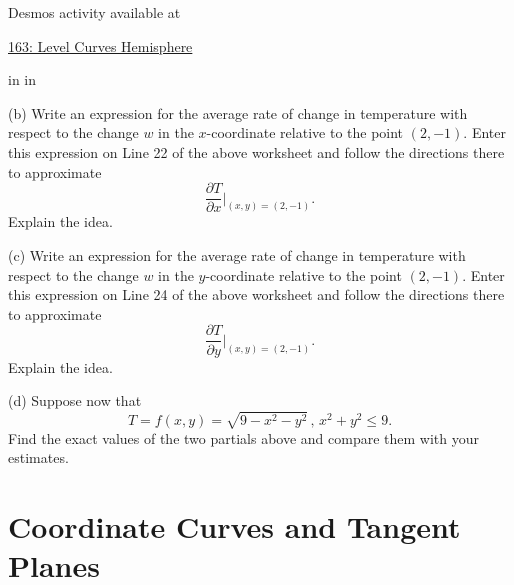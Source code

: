 \documentclass{ximera}
\newcommand{\pskip}{\vskip 0.1 in}
\begin{document}
\begin{example}
Desmos activity available at

\href{https://www.desmos.com/calculator/mrbwyydrcm}{163: Level Curves Hemisphere}

\pskip \pskip


(b) Write an expression for the average rate of change in temperature with respect to the change $w$ in the $x$-coordinate relative to the point $(2,-1)$. Enter this expression on Line 22 of the above worksheet and follow the directions there to approximate 
\[
   \frac{\partial T}{\partial x}\Big|_{(x,y)=(2,-1)} .
\]
Explain the idea.

(c) Write an expression for the average rate of change in temperature with respect to the change $w$ in the $y$-coordinate relative to the point $(2,-1)$. Enter this expression on Line 24 of the above worksheet and follow the directions there to approximate 
\[
   \frac{\partial T}{\partial y}\Big|_{(x,y)=(2,-1)} .
\]
Explain the idea.

(d) Suppose now that 
\[
    T = f(x,y) = \sqrt{9-x^2-y^2} \, , \, x^2 + y^2 \leq 9 .
\]
Find the exact values of the two partials above and compare them with your estimates.

\end{example}

\section{Coordinate Curves and Tangent Planes}
\end{document}
